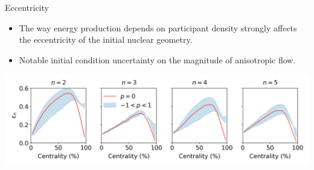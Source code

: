 \documentclass[11pt, aspectratio=169]{beamer}
\begin{document}
\begin{frame}{Eccentricity}
\begin{itemize}
\item The way energy production depends on participant density strongly affects the eccentricity of the initial nuclear geometry.
\item Notable initial condition uncertainty on the magnitude of anisotropic flow.
\end{itemize}
\begin{center}
\includegraphics[width=\textwidth]{ecc.png}
\end{center}
\end{frame}
\end{document}
